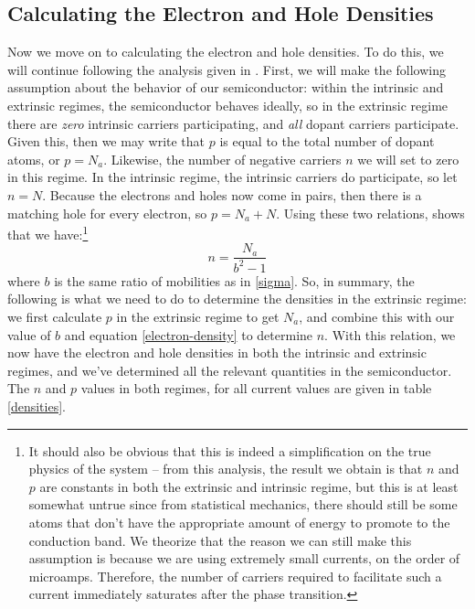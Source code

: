 \documentclass[10pt]{article}
\begin{document}
	\subsection{Calculating the Electron and Hole Densities}
	Now we move on to calculating the electron and hole densities. To do this, we will continue following the
	analysis given in \cite{melissinos}. First, we will make the following assumption about the behavior of our
	semiconductor: within the intrinsic and extrinsic regimes, the semiconductor behaves ideally, so 
	in the extrinsic regime there are \textit{zero} intrinsic carriers participating, and
	\textit{all} dopant carriers participate.
	Given this, then we may write that \( p \) is equal to the total number of
	dopant atoms, or \( p = N_a \). Likewise, the number of negative carriers \( n \) we will set to zero in
	this regime. In the intrinsic regime, the intrinsic carriers do participate, so let \( n = N \). Because
	the electrons and holes now come in pairs, then there is a matching hole for every electron, so \( p =
	N_a + N \). Using these two relations, \cite{melissinos} shows that we have:\footnote{It should also be obvious that 
		this is indeed a simplification on the true physics of the system -- from this analysis, the result we obtain
		is that \( n \) and \( p \) are constants in both the extrinsic and intrinsic regime, but this is at
		least somewhat untrue since from statistical mechanics, there should still be some atoms that don't
		have the appropriate amount of energy to promote to the conduction band. We theorize that the reason
		we can still make this assumption is because we are using extremely small currents, on the order of
		microamps. Therefore, the number of carriers required to facilitate such a current immediately
	saturates after the phase transition.} 
	\begin{equation}
		\label{electron-density}
		n = \frac{N_a}{b^2 - 1}
	\end{equation}
	where \( b \) is the same ratio of mobilities as in \ref{sigma}. 
	So, in summary, the following is what we need to do to determine the densities in the extrinsic regime:
	we first calculate \( p \) in the extrinsic regime to get \( N_a \), and combine this with our value of
	\( b \) and equation \ref{electron-density} to determine \( n \). With this relation, we now have the
	electron and hole densities in both the intrinsic and extrinsic regimes, and we've determined all the
	relevant quantities in the semiconductor. The \( n \) and \( p \) values in both regimes, for all current
	values are given in table \ref{densities}.  
\end{document}
